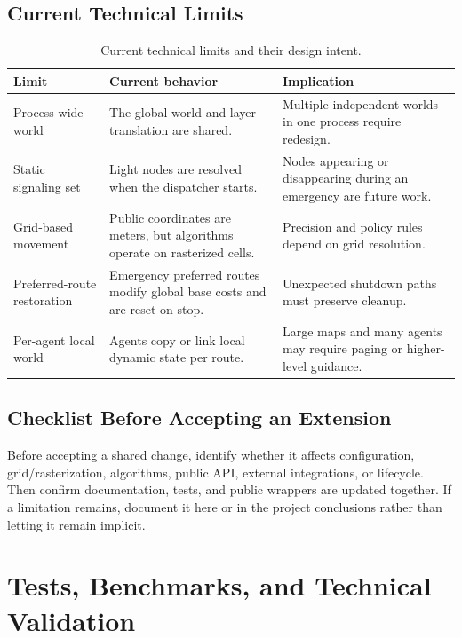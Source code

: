 \documentclass[12pt,a4paper]{report}
\begin{document}
\subsection{Current Technical Limits}

\begin{table}[H]
\centering
\begin{tabular}{|p{}|p{}|p{}|}
\hline
\textbf{Limit} & \textbf{Current behavior} & \textbf{Implication} \\
\hline
Process-wide world &
The global world and layer translation are shared. &
Multiple independent worlds in one process require redesign. \\
\hline
Static signaling set &
Light nodes are resolved when the dispatcher starts. &
Nodes appearing or disappearing during an emergency are future work. \\
\hline
Grid-based movement &
Public coordinates are meters, but algorithms operate on rasterized cells. &
Precision and policy rules depend on grid resolution. \\
\hline
Preferred-route restoration &
Emergency preferred routes modify global base costs and are reset on stop. &
Unexpected shutdown paths must preserve cleanup. \\
\hline
Per-agent local world &
Agents copy or link local dynamic state per route. &
Large maps and many agents may require paging or higher-level guidance. \\
\hline
\end{tabular}
\caption{Current technical limits and their design intent.}
\end{table}

\subsection{Checklist Before Accepting an Extension}

Before accepting a shared change, identify whether it affects configuration,
grid/rasterization, algorithms, public API, external integrations, or lifecycle.
Then confirm documentation, tests, and public wrappers are updated together. If
a limitation remains, document it here or in the project conclusions rather than
letting it remain implicit.

\section{Tests, Benchmarks, and Technical Validation}
\end{document}
